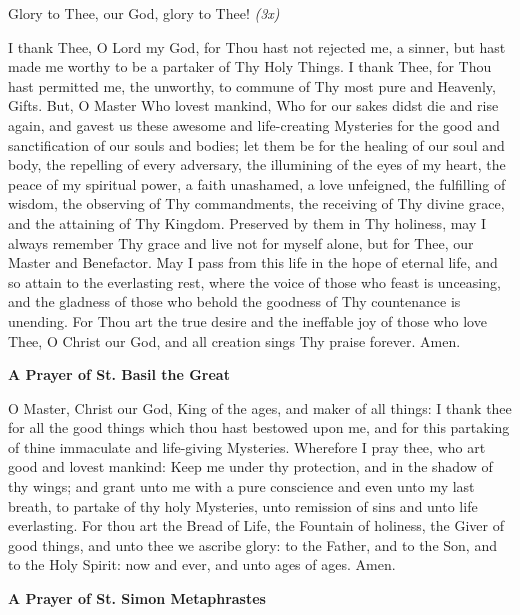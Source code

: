 \begin{center}
\end{center}

\noindent{}Glory to Thee, our God, glory to Thee! \textit{(3x)}

I thank Thee, O Lord my God, for Thou hast not rejected me, a sinner, but hast made me worthy to be a partaker of Thy Holy Things. I thank Thee, for Thou hast permitted me, the unworthy, to commune of Thy most pure and Heavenly, Gifts. But, O Master Who lovest mankind, Who for our sakes didst die and rise again, and gavest us these awesome and life-creating Mysteries for the good and sanctification of our souls and bodies; let them be for the healing of our soul and body, the repelling of every adversary, the illumining of the eyes of my heart, the peace of my spiritual power, a faith unashamed, a love unfeigned, the fulfilling of wisdom, the observing of Thy commandments, the receiving of Thy divine grace, and the attaining of Thy Kingdom. Preserved by them in Thy holiness, may I always remember Thy grace and live not for myself alone, but for Thee, our Master and Benefactor. May I pass from this life in the hope of eternal life, and so attain to the everlasting rest, where the voice of those who feast is unceasing, and the gladness of those who behold the goodness of Thy countenance is unending. For Thou art the true desire and the ineffable joy of those who love Thee, O Christ our God, and all creation sings Thy praise forever. Amen.

\begin{center}
	\textbf{A Prayer of St. Basil the Great}
\end{center}

O Master, Christ our God, King of the ages, and maker of all things: I thank thee for all the good things which thou hast bestowed upon me, and for this partaking of thine immaculate and life-giving Mysteries. Wherefore I pray thee, who art good and lovest mankind: Keep me under thy protection, and in the shadow of thy wings; and grant unto me with a pure conscience and even unto my last breath, to partake of thy holy Mysteries, unto remission of sins and unto life everlasting. For thou art the Bread of Life, the Fountain of holiness, the Giver of good things, and unto thee we ascribe glory: to the Father, and to the Son, and to the Holy Spirit: now and ever, and unto ages of ages. Amen.


\begin{center}
	\textbf{A Prayer of St. Simon Metaphrastes}
\end{center}

